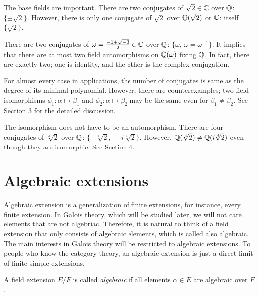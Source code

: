 \documentclass{../note}
\begin{document}
\begin{ex}
The base fields are important.
There are two conjugates of $\sqrt2\in\mathbb{C}$ over $\mathbb{Q}$: $\{\pm\sqrt2\}$.
However, there is only one conjugate of $\sqrt2$ over $\mathbb{Q}(\sqrt2)$ or $\mathbb{C}$: itself $\{\sqrt2\}$.
\end{ex}

\begin{ex}
There are two conjugates of $\omega=\frac{-1+\sqrt{-3}}2\in\mathbb{C}$ over $\mathbb{Q}$: $\{\omega,\,\bar\omega=\omega^{-1}\}$.
It implies that there are at most two field automorphisms on $\mathbb{Q}(\omega)$ fixing $\mathbb{Q}$.
In fact, there are exactly two; one is identity, and the other is the complex conjugation.
\end{ex}

\begin{ex}
For almost every case in applications, the number of conjugates is same as the degree of its minimal polynomial.
However, there are counterexamples; two field isomorphisms $\phi_1:\alpha\mapsto\beta_1$ and $\phi_2:\alpha\mapsto\beta_2$ may be the same even for $\beta_1\ne\beta_2$.
See Section 3 for the detailed discussion.
\end{ex}

\begin{ex}
The isomorphism does not have to be an automorphism.
There are four conjugates of $\sqrt[4]2$ over $\mathbb{Q}$: $\{\pm\sqrt[4]2,\,\pm i\sqrt[4]2\}$.
However, $\mathbb{Q}(\sqrt[4]2)\ne\mathbb{Q}(i\sqrt[4]2)$ even though they are isomorphic.
See Section 4.
\end{ex}




\section{Algebraic extensions}

Algebraic extension is a generalization of finite extensions, for instance, every finite extension.
In Galois theory, which will be studied later, we will not care elements that are not algebriac.
Therefore, it is natural to think of a field extension that only consists of algebraic elements, which is called also algebraic.
The main interests in Galois theory will be restricted to algebraic extensions.
To people who know the category theory, an algebraic extension is just a direct limit of finite simple extensions.

\begin{defn}
A field extension $E/F$ is called \emph{algebraic} if all elements $\alpha\in E$ are algebraic over $F$.
\end{defn}
\end{document}
